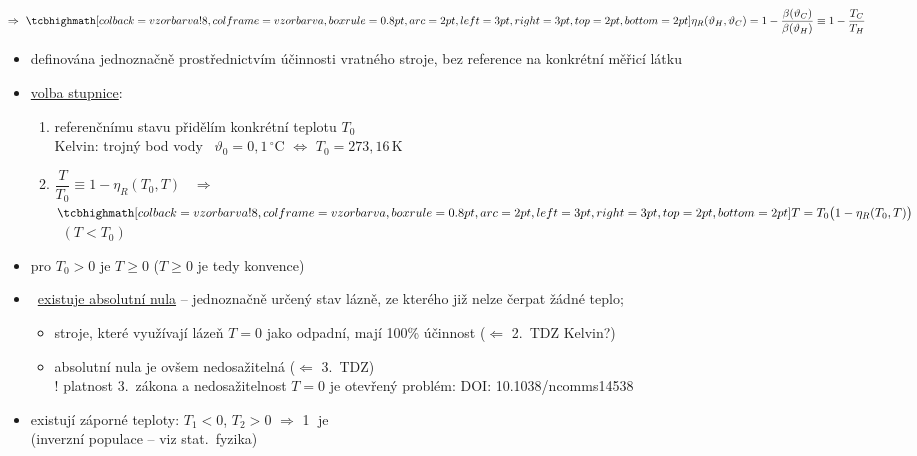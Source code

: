 \begin{minipage}{0.62\textwidth}
\[
  \Rightarrow\ \vzorec{\eta_R(\vartheta_H,\vartheta_C) = 1 - \frac{\beta(\vartheta_C)}{\beta(\vartheta_H)} \equiv 1 - \frac{T_C}{T_H}}
\]
\end{minipage}
\hfill
{}

\begin{definice}
\begin{itemize}[nosep]
  \item definována jednoznačně prostřednictvím účinnosti vratného stroje, bez reference na konkrétní měřicí látku
  \item \underline{volba stupnice}:
  \begin{enumerate}[label=\arabic*),nosep]
    \item referenčnímu stavu přidělím konkrétní teplotu $T_0$ \\
          Kelvin: trojný bod vody \ $\vartheta_0 = 0{,}1\,^\circ$C  $\Leftrightarrow$ $T_0 = 273{,}16$\,K
    \item $\boxed{\dfrac{T}{T_0} \equiv 1 - \eta_R(T_0,T)}$ \ $\Rightarrow$ \
          $\vzorec{T = T_0\big(1 - \eta_R(T_0,T)\big)}$ \ $(T < T_0)$ \
  \end{enumerate}
\end{itemize}
\end{definice}

\begin{itemize}
  \item pro $T_0 > 0$ je $T \geq 0$ \qquad ($T\geq 0$ je tedy konvence)
  \item \pozor{!}\ \underline{existuje absolutní nula} -- jednoznačně určený stav lázně, ze kterého již nelze čerpat žádné teplo;
  \begin{itemize}[nosep]
    \item[--] stroje, které využívají lázeň $T = 0$ jako odpadní, mají 100\% účinnost \hfill {\color{Red}($\Leftarrow$ 2.\ TDZ Kelvin?)}
    \item[--] absolutní nula je ovšem nedosažitelná ($\Leftarrow$ 3.\ TDZ) \\
          {\color{NavyBlue}\small ! platnost 3.\ zákona a nedosažitelnost $T = 0$ je otevřený problém: DOI: 10.1038/ncomms14538}
  \end{itemize}
  \item existují záporné teploty: $T_1 < 0$, $T_2 > 0$ $\Rightarrow$ \textcircled{1} je \uv{teplejší} \\
        (inverzní populace -- viz stat.\ fyzika)
\end{itemize}

